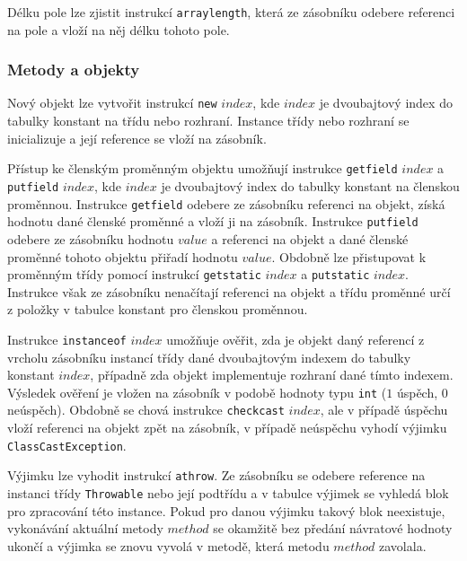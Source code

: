 Délku pole lze zjistit instrukcí \texttt{arraylength}, která ze zásobníku odebere referenci na pole a vloží na něj délku tohoto pole.

\subsubsection{Metody a objekty}

Nový objekt lze vytvořit instrukcí \texttt{new} $index$, kde $index$ je dvoubajtový index do tabulky konstant na třídu nebo rozhraní. Instance třídy nebo rozhraní se inicializuje a její reference se vloží na zásobník.

Přístup ke členským proměnným objektu umožňují instrukce \texttt{getfield} $index$ a \texttt{putfield} $index$, kde $index$ je dvoubajtový index do tabulky konstant na členskou proměnnou. Instrukce \texttt{getfield} odebere ze zásobníku referenci na objekt, získá hodnotu dané členské proměnné a vloží ji na zásobník. Instrukce \texttt{putfield} odebere ze zásobníku hodnotu $value$ a referenci na objekt a dané členské proměnné tohoto objektu přiřadí hodnotu $value$. Obdobně lze přistupovat k proměnným třídy pomocí instrukcí \texttt{getstatic} $index$ a \texttt{putstatic} $index$. Instrukce však ze zásobníku nenačítají referenci na objekt a třídu proměnné určí z položky v tabulce konstant pro členskou proměnnou.





Instrukce \texttt{instanceof} $index$ umožňuje ověřit, zda je objekt daný referencí z vrcholu zásobníku instancí třídy dané dvoubajtovým indexem do tabulky konstant  $index$, případně zda objekt implementuje rozhraní dané tímto indexem. Výsledek ověření je vložen na zásobník v podobě hodnoty typu \texttt{int} ($1$ úspěch, $0$ neúspěch). Obdobně se chová instrukce \texttt{checkcast} $index$, ale v případě úspěchu vloží referenci na objekt zpět na zásobník, v případě neúspěchu vyhodí výjimku \texttt{ClassCastException}.


Výjimku lze vyhodit instrukcí \texttt{athrow}. Ze zásobníku se odebere reference na instanci třídy \texttt{Throwable} nebo její podtřídu a v tabulce výjimek se vyhledá blok pro zpracování této instance. Pokud pro danou výjimku takový blok neexistuje, vykonávání aktuální metody $method$ se okamžitě bez předání návratové hodnoty ukončí a výjimka se znovu vyvolá v metodě, která metodu $method$ zavolala. 


